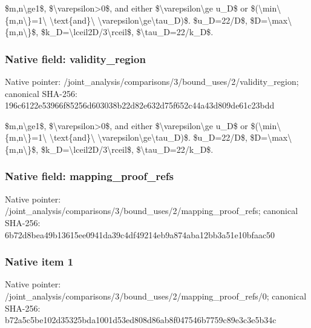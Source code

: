 \documentclass[10pt,a4paper]{article}
\begin{document}
\$m,n\textbackslash{}ge1\$, \$\textbackslash{}varepsilon>0\$, and either \$\textbackslash{}varepsilon\textbackslash{}ge u\_D\$ or \$(\textbackslash{}min\textbackslash{}\{m,n\textbackslash{}\}=1\textbackslash{} \textbackslash{}text\{and\}\textbackslash{} \textbackslash{}varepsilon\textbackslash{}ge\textbackslash{}tau\_D)\$. \$u\_D=22/D\$, \$D=\textbackslash{}max\textbackslash{}\{m,n\textbackslash{}\}\$, \$k\_D=\textbackslash{}lceil2D/3\textbackslash{}rceil\$, \$\textbackslash{}tau\_D=22/k\_D\$.


\subsubsection{Native field: validity\_region}


Native pointer: /joint\_analysis/comparis\allowbreak{}ons/3/bound\_uses/2/valid\allowbreak{}ity\_region; canonical SHA-256: 196c6122e53966f85256d603\allowbreak{}038b22d82e632d75f652c44a\allowbreak{}43d809de61c23bdd


\$m,n\textbackslash{}ge1\$, \$\textbackslash{}varepsilon>0\$, and either \$\textbackslash{}varepsilon\textbackslash{}ge u\_D\$ or \$(\textbackslash{}min\textbackslash{}\{m,n\textbackslash{}\}=1\textbackslash{} \textbackslash{}text\{and\}\textbackslash{} \textbackslash{}varepsilon\textbackslash{}ge\textbackslash{}tau\_D)\$. \$u\_D=22/D\$, \$D=\textbackslash{}max\textbackslash{}\{m,n\textbackslash{}\}\$, \$k\_D=\textbackslash{}lceil2D/3\textbackslash{}rceil\$, \$\textbackslash{}tau\_D=22/k\_D\$.


\subsubsection{Native field: mapping\_proof\_refs}


Native pointer: /joint\_analysis/comparis\allowbreak{}ons/3/bound\_uses/2/mappi\allowbreak{}ng\_proof\_refs; canonical SHA-256: 6b72d8bea49b13615ee0941d\allowbreak{}a39c4df49214eb9a874aba12\allowbreak{}bb3a51e10bfaac50



\subsubsection{Native item 1}


Native pointer: /joint\_analysis/comparis\allowbreak{}ons/3/bound\_uses/2/mappi\allowbreak{}ng\_proof\_refs/0; canonical SHA-256: b72a5c5be102d35325bda100\allowbreak{}1d53ed808d86ab8f047546b7\allowbreak{}759c89e3c3e5b34c
\end{document}
